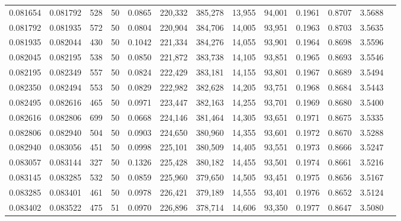 \begin{tabular}{rrrrrrrrrrrrr}
0.081654 & 0.081792 &   528 &  50 &                                     0.0865 & 220,332 & 385,278 &  13,955 &  94,001 & 0.1961 & 0.8707 & 3.5688 \\
0.081792 & 0.081935 &   572 &  50 &                                     0.0804 & 220,904 & 384,706 &  14,005 &  93,951 & 0.1963 & 0.8703 & 3.5635 \\
0.081935 & 0.082044 &   430 &  50 &                                     0.1042 & 221,334 & 384,276 &  14,055 &  93,901 & 0.1964 & 0.8698 & 3.5596 \\
0.082045 & 0.082195 &   538 &  50 &                                     0.0850 & 221,872 & 383,738 &  14,105 &  93,851 & 0.1965 & 0.8693 & 3.5546 \\
0.082195 & 0.082349 &   557 &  50 &                                     0.0824 & 222,429 & 383,181 &  14,155 &  93,801 & 0.1967 & 0.8689 & 3.5494 \\
0.082350 & 0.082494 &   553 &  50 &                                     0.0829 & 222,982 & 382,628 &  14,205 &  93,751 & 0.1968 & 0.8684 & 3.5443 \\
0.082495 & 0.082616 &   465 &  50 &                                     0.0971 & 223,447 & 382,163 &  14,255 &  93,701 & 0.1969 & 0.8680 & 3.5400 \\
0.082616 & 0.082806 &   699 &  50 &                                     0.0668 & 224,146 & 381,464 &  14,305 &  93,651 & 0.1971 & 0.8675 & 3.5335 \\
0.082806 & 0.082940 &   504 &  50 &                                     0.0903 & 224,650 & 380,960 &  14,355 &  93,601 & 0.1972 & 0.8670 & 3.5288 \\
0.082940 & 0.083056 &   451 &  50 &                                     0.0998 & 225,101 & 380,509 &  14,405 &  93,551 & 0.1973 & 0.8666 & 3.5247 \\
0.083057 & 0.083144 &   327 &  50 &                                     0.1326 & 225,428 & 380,182 &  14,455 &  93,501 & 0.1974 & 0.8661 & 3.5216 \\
0.083145 & 0.083285 &   532 &  50 &                                     0.0859 & 225,960 & 379,650 &  14,505 &  93,451 & 0.1975 & 0.8656 & 3.5167 \\
0.083285 & 0.083401 &   461 &  50 &                                     0.0978 & 226,421 & 379,189 &  14,555 &  93,401 & 0.1976 & 0.8652 & 3.5124 \\
0.083402 & 0.083522 &   475 &  51 &                                     0.0970 & 226,896 & 378,714 &  14,606 &  93,350 & 0.1977 & 0.8647 & 3.5080 \\

\end{tabular}
